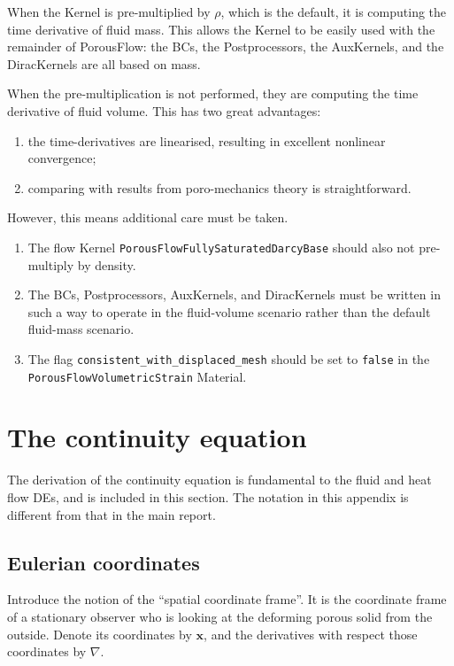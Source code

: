\documentclass[12pt]{report}
\begin{document}
When the Kernel is pre-multiplied by $\rho$, which is the default,
it is computing the time derivative of fluid mass.  This allows
the Kernel to be easily used with the remainder of PorousFlow: the
BCs, the Postprocessors, the AuxKernels, and the DiracKernels are all
based on mass.

When the pre-multiplication is not performed, they are computing the
time derivative of fluid volume.  This has two great advantages:
\begin{enumerate}
\item the time-derivatives are linearised, resulting in excellent
  nonlinear convergence;
\item comparing with results from poro-mechanics theory is
  straightforward.
\end{enumerate}
However, this means additional care must be taken.
\begin{enumerate}
\item The flow Kernel {\tt PorousFlowFullySaturatedDarcyBase} should
  also not pre-multiply by density.
\item The BCs, Postprocessors, AuxKernels, and DiracKernels must be
  written in such a way to operate in the fluid-volume scenario rather
  than the default fluid-mass scenario.
\item The flag {\tt consistent\_with\_displaced\_mesh} should be set
  to {\tt false} in the {\tt PorousFlowVolumetricStrain} Material.
\end{enumerate}




\appendix

\chapter{The continuity equation}

The derivation of the continuity equation is fundamental to the fluid
and heat flow DEs, and is
included in this section.  The notation in this appendix is different
from that in the main report.

\section{Eulerian coordinates}

Introduce the notion of the ``spatial coordinate frame''.  It is the
coordinate frame of a stationary observer who is looking at the
deforming porous solid from the outside.  Denote its coordinates by
${\mathbf x}$, and the derivatives with respect those coordinates by
$\nabla$.
\end{document}
